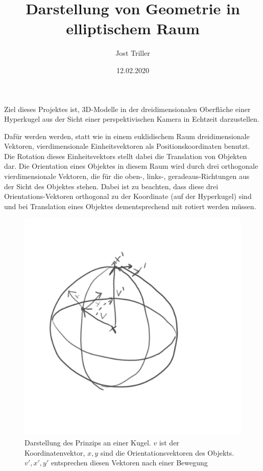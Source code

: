 \documentclass[11pt]{article}
\begin{document}
    \title{Darstellung von Geometrie in elliptischem Raum}
    \author{Jost Triller}
    \date{12.02.2020}
    \maketitle

    Ziel dieses Projektes ist, 3D-Modelle in der dreidimensionalen Oberfläche einer Hyperkugel aus der Sicht einer
    perspektivischen Kamera in Echtzeit darzustellen.

    Dafür werden werden, statt wie in einem euklidischem Raum dreidimensionale Vektoren, vierdimensionale Einheitsvektoren
    als Positionskoordinaten benutzt.
    Die Rotation dieses Einheitsvektors stellt dabei die Translation von Objekten dar.
    Die Orientation eines Objektes in diesem Raum wird durch drei orthogonale vierdimensionale Vektoren, die für die
    oben-, links-, geradeaus-Richtungen aus der Sicht des Objektes stehen.
    Dabei ist zu beachten, dass diese drei Orientations-Vektoren orthogonal zu der Koordinate (auf der Hyperkugel) sind
    und bei Translation eines Objektes dementsprechend mit rotiert werden müssen.

    \begin{figure}[H]
        \includegraphics[width=0.8\linewidth]{hypersphere2d.png}
        \caption{Darstellung des Prinzips an einer Kugel. $v$ ist der Koordinatenvektor,
            $x,y$ sind die Orientationsvektoren des Objekts. $v',x',y'$ entsprechen diesen Vektoren nach einer Bewegung}
        \label{fig:hypesphere2d}
    \end{figure}
\end{document}
